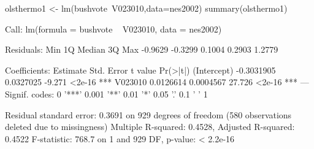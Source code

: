 \begin{Schunk}
\begin{Sinput}
 olsthermo1 <- lm(bushvote~V023010,data=nes2002) 
 summary(olsthermo1)
\end{Sinput}
\begin{Soutput}
Call:
lm(formula = bushvote ~ V023010, data = nes2002)

Residuals:
    Min      1Q  Median      3Q     Max 
-0.9629 -0.3299  0.1004  0.2903  1.2779 

Coefficients:
              Estimate Std. Error t value Pr(>|t|)    
(Intercept) -0.3031905  0.0327025  -9.271   <2e-16 ***
V023010      0.0126614  0.0004567  27.726   <2e-16 ***
---
Signif. codes:  0 '***' 0.001 '**' 0.01 '*' 0.05 '.' 0.1 ' ' 1

Residual standard error: 0.3691 on 929 degrees of freedom
  (580 observations deleted due to missingness)
Multiple R-squared:  0.4528,	Adjusted R-squared:  0.4522 
F-statistic: 768.7 on 1 and 929 DF,  p-value: < 2.2e-16
\end{Soutput}
\end{Schunk}
